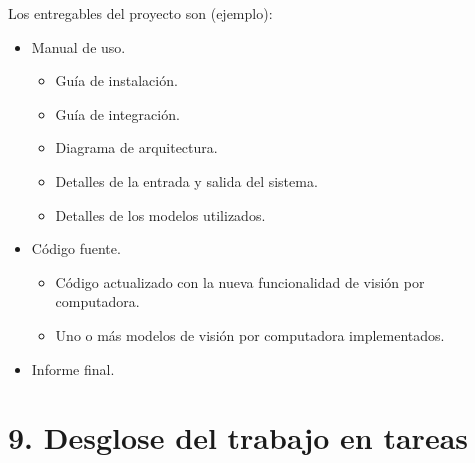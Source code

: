 \documentclass[
11pt, %
]{charter}
\begin{document}
Los entregables del proyecto son (ejemplo):

\begin{itemize}
	\item Manual de uso.
	\begin{itemize}
	\item Guía de instalación.
	\item Guía de integración.
	\item Diagrama de arquitectura.
	\item Detalles de la entrada y salida del sistema.
	\item Detalles de los modelos utilizados.
	\end{itemize}
	\item Código fuente.
	\begin{itemize}
	\item Código actualizado con la nueva funcionalidad de visión por computadora.
	\item Uno o más modelos de visión por computadora implementados.
	\end{itemize}
	\item Informe final.
\end{itemize}

\section{9. Desglose del trabajo en tareas}
\label{sec:wbs}
\end{document}
